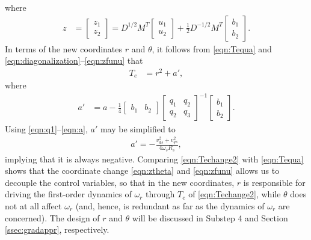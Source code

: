 \documentclass[journal]{IEEEtran}
\begin{document}
where
\begin{align}
z&=
\begin{bmatrix}
z_1 \\ z_2
\end{bmatrix}=D^{1/2}M^T\begin{bmatrix}
u_1 \\ u_2 \end{bmatrix}+\frac{1}{2}D^{-1/2}M^T\begin{bmatrix}
b_1 \\ b_2 \end{bmatrix}. \label{eqn:zfunu}
\end{align}
In terms of the new coordinates $r$ and $\theta$, it follows from \eqref{eqn:Tequa} and \eqref{eqn:diagonalization}--\eqref{eqn:zfunu} that
\begin{align}
T_e&=r^2+a',\label{eqn:Techange2}
\end{align}
where
\begin{align*}
a'&=a-\frac{1}{4}
\begin{bmatrix} b_1 & b_2 \end{bmatrix}
\begin{bmatrix}
q_1 & q_2 \\
q_2 & q_3
\end{bmatrix}^{-1}
\begin{bmatrix} b_1 \\ b_2 \end{bmatrix}.
\end{align*}
Using \eqref{eqn:q1}--\eqref{eqn:a}, $a'$ may be simplified to
\begin{align}
a'=-\frac{v_{ds}^2+v_{qs}^2}{4\omega_sR_s},\label{eqn:a1}
\end{align}
implying that it is always negative. Comparing \eqref{eqn:Techange2} with \eqref{eqn:Tequa} shows that the coordinate change \eqref{eqn:ztheta} and \eqref{eqn:zfunu} allows us to decouple the control variables, so that in the new coordinates, $r$ is responsible for driving the first-order dynamics of $\omega_r$ through $T_e$ of \eqref{eqn:Techange2}, while $\theta$ does not at all affect $\omega_r$ (and, hence, is redundant as far as the dynamics of $\omega_r$ are concerned). The design of $r$ and $\theta$ will be discussed in Substep 4 and Section \ref{ssec:gradappr}, respectively.
\end{document}
